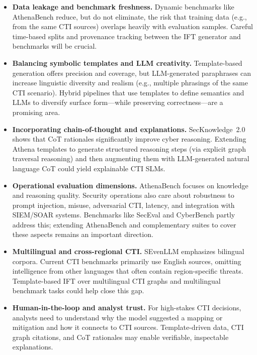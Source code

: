 \documentclass[10pt]{article}
\begin{document}
\begin{itemize}[leftmargin=*]
  \item \textbf{Data leakage and benchmark freshness.} Dynamic benchmarks like AthenaBench reduce, but do not eliminate, the risk that training data (e.g., from the same CTI sources) overlaps heavily with evaluation samples. Careful time-based splits and provenance tracking between the IFT generator and benchmarks will be crucial.\cite{alam2025athenabench,cardei2025ift}
  \item \textbf{Balancing symbolic templates and LLM creativity.} Template-based generation offers precision and coverage, but LLM-generated paraphrases can increase linguistic diversity and realism (e.g., multiple phrasings of the same CTI scenario). Hybrid pipelines that use templates to define semantics and LLMs to diversify surface form—while preserving correctness—are a promising area.
  \item \textbf{Incorporating chain-of-thought and explanations.} SecKnowledge~2.0 shows that CoT rationales significantly improve cyber reasoning.\cite{levi2025toward} Extending Athena templates to generate structured reasoning steps (via explicit graph traversal reasoning) and then augmenting them with LLM-generated natural language CoT could yield explainable CTI SLMs.
  \item \textbf{Operational evaluation dimensions.} AthenaBench focuses on knowledge and reasoning quality. Security operations also care about robustness to prompt injection, misuse, adversarial CTI, latency, and integration with SIEM/SOAR systems. Benchmarks like SecEval and CyberBench partly address this; extending AthenaBench and complementary suites to cover these aspects remains an important direction.\cite{hu2024seceval,liu2024cyberbench,alam2025athenabench}
  \item \textbf{Multilingual and cross-regional CTI.} SEvenLLM emphasizes bilingual corpora.\cite{ji2024sevenllm} Current CTI benchmarks primarily use English sources, omitting intelligence from other languages that often contain region-specific threats. Template-based IFT over multilingual CTI graphs and multilingual benchmark tasks could help close this gap.
  \item \textbf{Human-in-the-loop and analyst trust.} For high-stakes CTI decisions, analysts need to understand why the model suggested a mapping or mitigation and how it connects to CTI sources. Template-driven data, CTI graph citations, and CoT rationales may enable verifiable, inspectable explanations.
\end{itemize}
\end{document}
